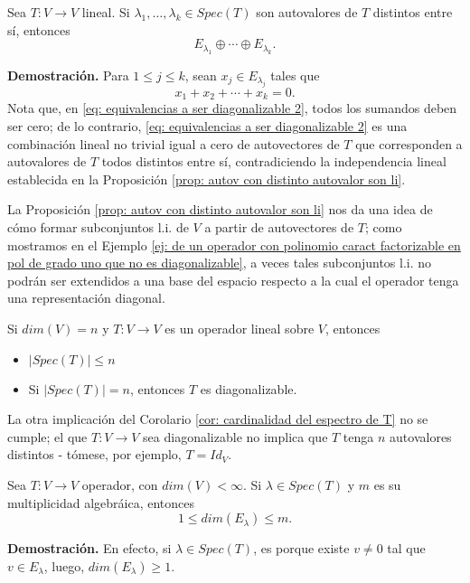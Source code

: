 \begin{cor}
	\label{cor: suma de autoespacios de un operador es directa.}
	Sea
	$T: V \longrightarrow V$ lineal. Si $\lambda_{1}, \ldots , \lambda_{k}
	\in Spec(T)$ son autovalores de $T$ distintos entre sí, entonces
	\[
	E_{\lambda_{1}} \oplus \cdots \oplus E_{\lambda_{k}}.
	\]
\end{cor}
\textbf{Demostración.}
Para $1 \leq j \leq k$, sean $x_{j} \in E_{\lambda_{j}}$ tales que 
\begin{equation}
	\label{eq: equivalencias a ser diagonalizable 2}
	x_{1} + x_{2} + \cdots + x_{k} = 0.
\end{equation}
Nota que, en \eqref{eq: equivalencias a ser diagonalizable 2}, todos
los sumandos deben ser cero; de lo contrario, 
\eqref{eq: equivalencias a ser diagonalizable 2} es una combinación
lineal no trivial igual a cero de autovectores de $T$ que corresponden
a autovalores de $T$ todos distintos entre sí, contradiciendo la
independencia lineal establecida en 
la Proposición 
\ref{prop: autov con distinto autovalor son li}.
\QEDB
\vspace{0.2cm}


La Proposición \ref{prop: autov con distinto autovalor son li} nos da
una idea de cómo formar subconjuntos l.i. de $V$ a partir de autovectores de 
$T$; como mostramos en el Ejemplo
\ref{ej: de un operador con polinomio caract factorizable en pol de grado uno que no es diagonalizable},
a veces tales subconjuntos l.i.
no podrán ser extendidos a una base del espacio respecto a la cual
el operador tenga una representación diagonal.


\begin{cor}
	\label{cor: cardinalidad del espectro de T}
	Si $dim(V) = n$ y $T: V \longrightarrow V$ es un operador lineal sobre $V$,
	entonces
	\begin{itemize}
		\item $|Spec(T)| \leq n$
		\item Si $|Spec(T)| = n$, entonces $T$ es diagonalizable.
	\end{itemize}
\end{cor}
La otra implicación del Corolario \eqref{cor: cardinalidad del espectro de T} no
se cumple; el que $T: V \longrightarrow V$ sea diagonalizable no implica
que $T$ tenga $n$ autovalores distintos - tómese, por ejemplo, $T = Id_{V}$.

\begin{prop}
	\label{prop: relacion multiplicidad alg y dimension del autoespacio}
	Sea $T: V \longrightarrow V$ operador, con $dim(V) < \infty$.
	Si $\lambda \in Spec(T)$ y $m$ es su multiplicidad algebráica, entonces
	\[
	1 \leq dim(E_{\lambda}) \leq m.
	\]
\end{prop}
\textbf{Demostración.}
En efecto, si $\lambda \in Spec(T)$, es porque existe $v \neq 0$
tal que $v \in E_{\lambda}$, luego, $dim(E_{\lambda}) \geq 1$.

